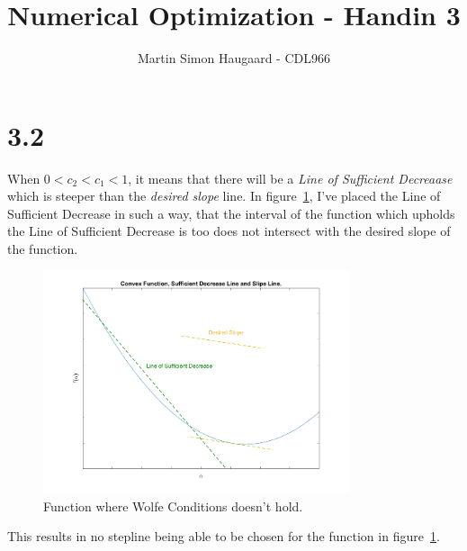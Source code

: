 \documentclass[11pt]{article} %
\title{Numerical Optimization - Handin 3}
\author{Martin Simon Haugaard - CDL966}
\begin{document}
\maketitle

\section*{3.2}
When $0<c_2<c_1<1$, it means that there will be a \textit{Line of Sufficient Decreaase} which is steeper than the \textit{desired slope} line. In figure~\ref{fig:3_2}, I've placed the Line of Sufficient Decrease in such a way, that the interval of the function which upholds the Line of Sufficient Decrease is too does not intersect with the desired slope of the function.

\begin{figure}[H]
    \centering
    \includegraphics[width=0.8\textwidth]{3_2}
    \caption{Function where Wolfe Conditions doesn't hold.}
    \label{fig:3_2}
\end{figure}

This results in no stepline being able to be chosen for the function in figure~\ref{fig:3_2}.
\end{document}

